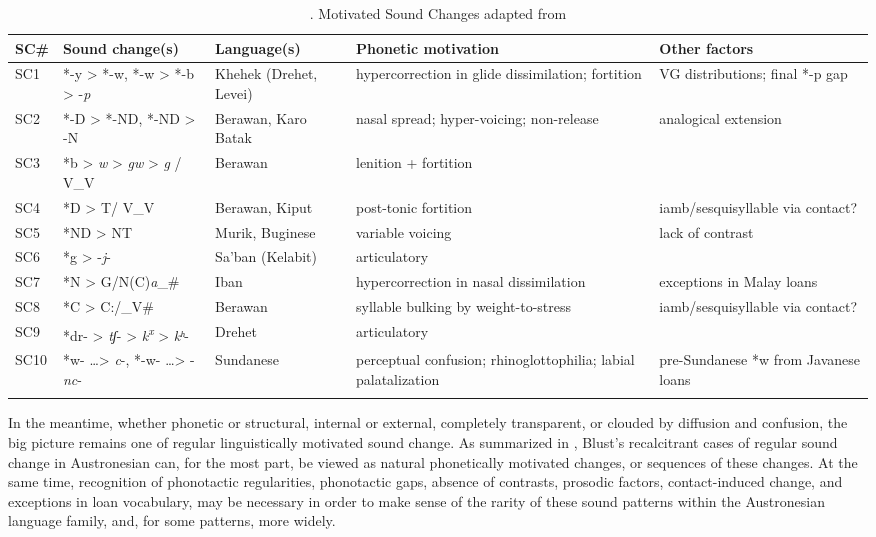 \documentclass[output=paper]{langscibook}
\begin{document}
\begin{sidewaystable}
\begin{tabularx}{\textwidth}{lllQQ}
\lsptoprule
\textbf{SC\#} & \textbf{Sound change(s)} & \textbf{Language(s)} & \textbf{Phonetic motivation} & \textbf{Other factors}\\
\midrule
SC1 & *-y >  *-w, *-w > *-b > -\textit{p} & Khehek (Drehet, Levei) & hypercorrection in glide dissimilation; fortition & VG distributions;  final *-p gap\\
SC2 & *-D > *-ND, *-ND > -N & Berawan, Karo Batak & nasal spread; hyper-voicing; non-release & analogical extension\\
SC3 & *b > \textit{w} > \textit{gw} > \textit{g} / V\_V & Berawan & lenition + fortition & \\
SC4 & *D > T/ V\_V & Berawan, Kiput & post-tonic fortition & iamb/sesquisyllable via contact?\\
SC5 & *ND > NT & Murik, Buginese & variable voicing & lack of contrast\\
SC6 & *g > -\textit{j}- & Sa’ban (Kelabit) & articulatory & \\
SC7 & *N > G/N(C)\textit{a}\_\# & Iban & hypercorrection in nasal dissimilation & exceptions in Malay loans\\
SC8 & *C > C:/\_V\# & Berawan & syllable bulking by weight-to-stress & iamb/sesquisyllable via contact?\\
SC9 & *dr- > \textit{tʃ}- > \textit{k\textsuperscript{x}} > \textit{kʰ}- & Drehet & articulatory & \\
SC10 & *w- …> \textit{c}-, *-w- …> -\textit{nc}- & Sundanese & perceptual confusion; rhinoglottophilia; labial palatalization & pre-Sundanese *w from Javanese loans\\
\lspbottomrule
\end{tabularx}
\caption{\label{tab:blevins:16}. Motivated Sound Changes adapted from \citet{Blust2005}}
\end{sidewaystable}


In the meantime, whether phonetic or structural, internal or external, completely transparent, or clouded by diffusion and confusion, the big picture remains one of regular linguistically motivated sound change. As summarized in , Blust’s recalcitrant cases of regular sound change in Austronesian can, for the most part, be viewed as natural phonetically motivated changes, or sequences of these changes. At the same time, recognition of phonotactic regularities, phonotactic gaps, absence of contrasts, prosodic factors, contact-induced change, and exceptions in loan vocabulary, may be necessary in order to make sense of the rarity of these sound patterns within the Austronesian language family, and, for some patterns, more widely.
\end{document}
